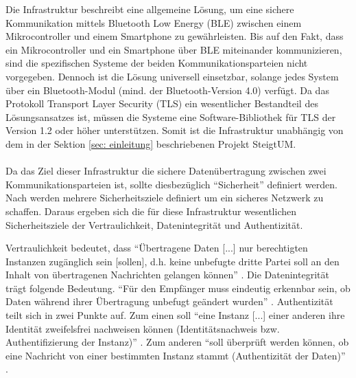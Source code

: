 Die Infrastruktur beschreibt eine allgemeine Lösung, um eine sichere Kommunikation mittels Bluetooth Low Energy (BLE) zwischen einem Mikrocontroller und einem Smartphone zu gewährleisten. Bis auf den Fakt, dass ein Mikrocontroller und ein Smartphone über BLE miteinander kommunizieren, sind die spezifischen Systeme der beiden Kommunikationsparteien nicht vorgegeben. Dennoch ist die Lösung universell einsetzbar, solange jedes System über ein Bluetooth-Modul (mind. der Bluetooth-Version 4.0) verfügt. Da das Protokoll Transport Layer Security (TLS) ein wesentlicher Bestandteil des Lösungsansatzes ist, müssen die Systeme eine Software-Bibliothek für TLS der Version 1.2 oder höher unterstützen. Somit ist die Infrastruktur unabhängig von dem in der Sektion \ref{sec: einleitung} beschriebenen Projekt SteigtUM.
\\\\
Da das Ziel dieser Infrastruktur die sichere Datenübertragung zwischen zwei Kommunikationsparteien ist, sollte diesbezüglich "`Sicherheit"' definiert werden. Nach \cite{Bless2005_19-20} werden mehrere Sicherheitsziele definiert um ein sicheres Netzwerk zu schaffen. Daraus ergeben sich die für diese Infrastruktur wesentlichen Sicherheitsziele der Vertraulichkeit, Datenintegrität und Authentizität.

Vertraulichkeit bedeutet, dass "`Übertragene Daten [...] nur berechtigten Instanzen zugänglich sein [sollen], d.h. keine unbefugte dritte Partei soll an den Inhalt von übertragenen Nachrichten gelangen können"' \cite{Bless2005_19}.
Die Datenintegrität trägt folgende Bedeutung. "`Für den Empfänger muss eindeutig erkennbar sein, ob Daten während ihrer Übertragung unbefugt geändert wurden"' \cite{Bless2005_19}.
Authentizität teilt sich in zwei Punkte auf. Zum einen soll "`eine Instanz [...] einer anderen ihre Identität zweifelsfrei nachweisen können (Identitätsnachweis bzw. Authentifizierung der Instanz)"' \cite{Bless2005_19}. 
Zum anderen "`soll überprüft werden können, ob eine Nachricht von einer bestimmten Instanz stammt (Authentizität der Daten)"' \cite{Bless2005_19}.
